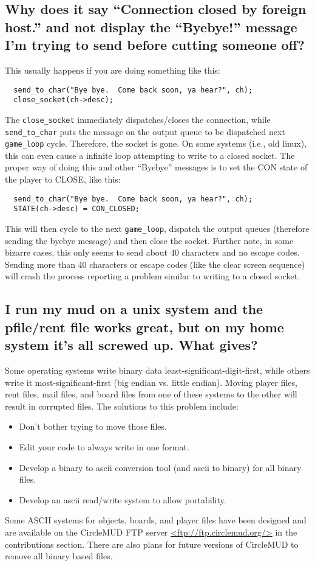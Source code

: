 \documentclass[11pt]{article}
\begin{document}
\subsection{Why does it say ``Connection closed by foreign host.'' and not display the ``Byebye!'' message I'm trying to send before cutting someone off?}
This usually happens if you are doing something like this:
\begin{verbatim}
  send_to_char("Bye bye.  Come back soon, ya hear?", ch);
  close_socket(ch->desc);
\end{verbatim}
The \texttt{close\_socket} immediately dispatches/closes the connection, while \texttt{send\_to\_char} puts the message on the output queue to be dispatched next
\texttt{game\_loop} cycle. Therefore, the socket is gone.  On some systems (i.e., old linux), this can even cause a infinite loop attempting to write to a closed socket. The proper way of doing this and other ``Byebye'' messages is to set the CON state of the player to CLOSE, like this:
\begin{verbatim}
  send_to_char("Bye bye.  Come back soon, ya hear?", ch);
  STATE(ch->desc) = CON_CLOSED;
\end{verbatim}
This will then cycle to the next \texttt{game\_loop}, dispatch the output queues (therefore sending the byebye message) and then close the socket. Further note, in some bizarre cases, this only seems to send about 40 characters and no escape codes.  Sending more than 40 characters or escape codes (like the clear screen sequence) will crash the process reporting a problem similar to writing to a closed socket. 

\subsection{I run my mud on a unix system and the pfile/rent file works great, but on my home system it's all screwed up.  What gives?}
Some operating systems write binary data least-significant-digit-first, while others write it most-significant-first (big endian vs. little endian). Moving player files, rent files, mail files, and board files from one of these systems to the other will result in corrupted files.  The solutions to this problem include:
\begin{itemize}
\item Don't bother trying to move those files.
\item Edit your code to always write in one format.
\item Develop a binary to ascii conversion tool (and ascii to binary) for all binary files.
\item Develop an ascii read/write system to allow portability.
\end{itemize}
Some ASCII systems for objects, boards, and player files have been designed and are available on the CircleMUD FTP server \url{<ftp://ftp.circlemud.org/>} in the contributions section.  There are also plans for future versions of CircleMUD to remove all binary based files.
\end{document}
